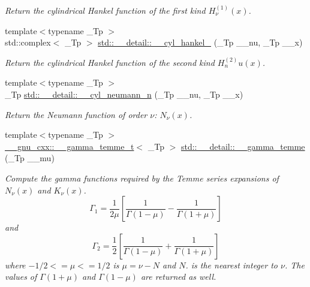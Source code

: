 \begin{DoxyCompactItemize}
\begin{DoxyCompactList}\small\item\em Return the cylindrical Hankel function of the first kind $ H^{(1)}_\nu(x) $. \end{DoxyCompactList}\item 
{\footnotesize template$<$typename \+\_\+\+Tp $>$ }\\std\+::complex$<$ \+\_\+\+Tp $>$ \hyperlink{namespacestd_1_1____detail_a98615677d4042ef02fe2faf326f1a614}{std\+::\+\_\+\+\_\+detail\+::\+\_\+\+\_\+cyl\+\_\+hankel\+\_} (\+\_\+\+Tp \+\_\+\+\_\+nu, \+\_\+\+Tp \+\_\+\+\_\+x)
\begin{DoxyCompactList}\small\item\em Return the cylindrical Hankel function of the second kind $ H^{(2)}_nu(x) $. \end{DoxyCompactList}\item 
{\footnotesize template$<$typename \+\_\+\+Tp $>$ }\\\+\_\+\+Tp \hyperlink{namespacestd_1_1____detail_ae414a6b5c064dc2b9b9a3b28e6cec813}{std\+::\+\_\+\+\_\+detail\+::\+\_\+\+\_\+cyl\+\_\+neumann\+\_\+n} (\+\_\+\+Tp \+\_\+\+\_\+nu, \+\_\+\+Tp \+\_\+\+\_\+x)
\begin{DoxyCompactList}\small\item\em Return the Neumann function of order $ \nu $\+: $ N_{\nu}(x) $. \end{DoxyCompactList}\item 
{\footnotesize template$<$typename \+\_\+\+Tp $>$ }\\\hyperlink{struct____gnu__cxx_1_1____gamma__temme__t}{\+\_\+\+\_\+gnu\+\_\+cxx\+::\+\_\+\+\_\+gamma\+\_\+temme\+\_\+t}$<$ \+\_\+\+Tp $>$ \hyperlink{namespacestd_1_1____detail_a0d4fa90f527fd05d057b27ba0366488a}{std\+::\+\_\+\+\_\+detail\+::\+\_\+\+\_\+gamma\+\_\+temme} (\+\_\+\+Tp \+\_\+\+\_\+mu)
\begin{DoxyCompactList}\small\item\em Compute the gamma functions required by the Temme series expansions of $ N_\nu(x) $ and $ K_\nu(x) $. \[ \Gamma_1 = \frac{1}{2\mu} \left[\frac{1}{\Gamma(1 - \mu)} - \frac{1}{\Gamma(1 + \mu)}\right] \] and \[ \Gamma_2 = \frac{1}{2} \left[\frac{1}{\Gamma(1 - \mu)} + \frac{1}{\Gamma(1 + \mu)}\right] \] where $ -1/2 <= \mu <= 1/2 $ is $ \mu = \nu - N $ and $ N $. is the nearest integer to $ \nu $. The values of $ \Gamma(1 + \mu) $ and $ \Gamma(1 - \mu) $ are returned as well. \end{DoxyCompactList}\item 

\end{DoxyCompactItemize}
